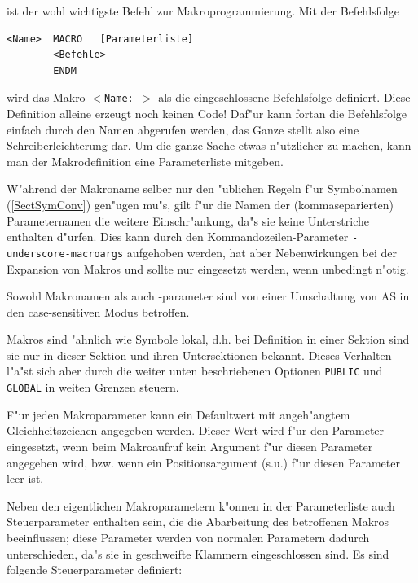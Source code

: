 \documentclass[12pt,a4paper,twoside]{report}
\newcommand{\tty}[1]{{\tt #1}}
\newcommand{\asname}{AS}
\begin{document}
ist der wohl wichtigste Befehl zur Makroprogrammierung.  Mit der
Befehlsfolge
\begin{verbatim}
<Name>  MACRO   [Parameterliste]
        <Befehle>
        ENDM
\end{verbatim}
wird das Makro \tty{$<$Name:  $>$} als die eingeschlossene Befehlsfolge
definiert. Diese Definition alleine erzeugt noch keinen Code!  Daf"ur kann
fortan die Befehlsfolge einfach durch den Namen abgerufen werden, das Ganze
stellt also eine Schreiberleichterung dar.  Um die ganze Sache etwas
n"utzlicher zu machen, kann man der Makrodefinition eine Parameterliste
mitgeben.
\par
W"ahrend der Makroname selber nur den "ublichen Regeln f"ur Symbolnamen
(\ref{SectSymConv}) gen"ugen mu"s, gilt f"ur die Namen der (kommaseparierten)
Parameternamen die weitere Einschr"ankung, da"s sie keine Unterstriche
enthalten d"urfen.  Dies kann durch den Kommandozeilen-Parameter
\tty{-underscore-macroargs} aufgehoben werden, hat aber Nebenwirkungen
bei der Expansion von Makros und sollte nur eingesetzt werden, wenn
unbedingt n"otig.
\par
Sowohl Makronamen als auch -parameter sind von einer Umschaltung
von \asname{} in den case-sensitiven Modus betroffen.
\par
Makros sind "ahnlich wie Symbole lokal, d.h. bei Definition in
einer Sektion sind sie nur in dieser Sektion und ihren Untersektionen
bekannt.  Dieses Verhalten l"a"st sich aber durch die weiter unten
beschriebenen Optionen \tty{PUBLIC} und \tty{GLOBAL} in weiten Grenzen
steuern.
\par
F"ur jeden Makroparameter kann ein Defaultwert mit angeh"angtem
Gleichheitszeichen angegeben werden.  Dieser Wert wird f"ur den
Parameter eingesetzt, wenn beim Makroaufruf kein Argument f"ur
diesen Parameter angegeben wird, bzw. wenn ein Positionsargument
(s.u.) f"ur diesen Parameter leer ist.
\par
Neben den eigentlichen Makroparametern k"onnen in der Parameterliste
auch Steuerparameter enthalten sein, die die Abarbeitung des betroffenen
Makros beeinflussen; diese Parameter werden von normalen Parametern
dadurch unterschieden, da"s sie in geschweifte Klammern eingeschlossen
sind.  Es sind folgende Steuerparameter definiert:
\end{document}
